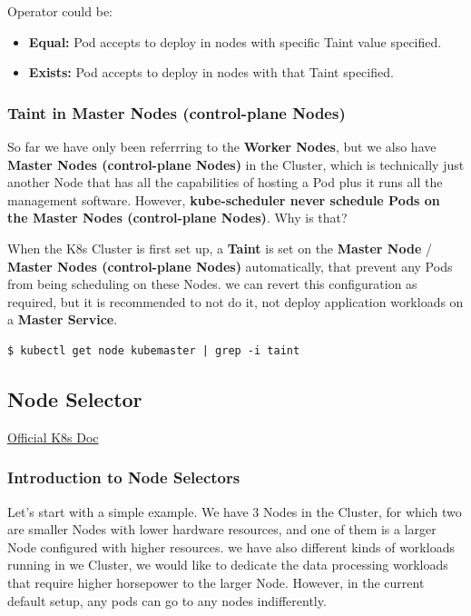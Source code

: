 \documentclass{article}
\newenvironment{codetemplate}[1][]{%
  \mybasecolorbox[#1]
  \itshape
}{%
  \endmybasecolorbox
}
\begin{document}
Operator could be:
\begin{itemize}
    \item \textbf{Equal:} Pod accepts to deploy in nodes with specific Taint value specified.
    \item \textbf{Exists:} Pod accepts to deploy in nodes with that Taint specified.
\end{itemize}

\subsubsection{Taint in Master Nodes (control-plane Nodes)}

So far we have only been referrring to the \textbf{Worker Nodes}, but we also have \textbf{Master Nodes (control-plane Nodes)} in the Cluster, which is technically just another Node that has all the capabilities of hosting a Pod plus it runs all the management software. However, \textbf{kube-scheduler never schedule Pods on the Master Nodes (control-plane Nodes)}. Why is that?

When the K8s Cluster is first set up, a \textbf{Taint} is set on the \textbf{Master Node} / \textbf{Master Nodes (control-plane Nodes)} automatically, that prevent any Pods from being scheduling on these Nodes. we can revert this configuration as required, but it is recommended to not do it, not deploy application workloads on a \textbf{Master Service}.

\begin{codetemplate}{}
\begin{verbatim}
$ kubectl get node kubemaster | grep -i taint
\end{verbatim}
\end{codetemplate}

\subsection{Node Selector}

\href{https://kubernetes.io/docs/concepts/scheduling-eviction/assign-pod-node/}{Official K8s Doc}

\subsubsection{Introduction to Node Selectors}

Let's start with a simple example. We have 3 Nodes in the Cluster, for which two are smaller Nodes with lower hardware resources, and one of them is a larger Node configured with higher resources. we have also different kinds of workloads running in we Cluster, we would like to dedicate the data processing workloads that require higher horsepower to the larger Node. However, in the current default setup, any pods can go to any nodes indifferently.
\end{document}
